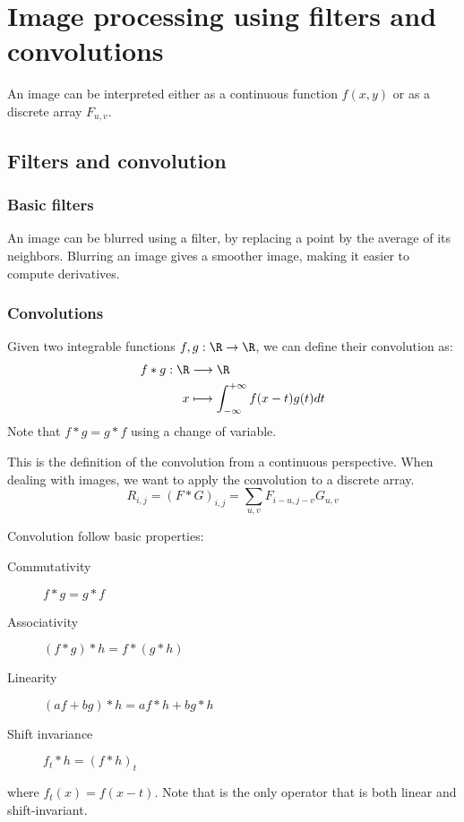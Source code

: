 \section{Image processing using filters and convolutions}
An image can be interpreted either as a continuous function $f(x, y)$ or as a discrete array $F_{u,v}$.

\subsection{Filters and convolution}
\subsubsection{Basic filters}
An image can be blurred using a filter, by replacing a point by the average of its neighbors. Blurring an image gives a smoother image, making it easier to compute derivatives. 

\subsubsection{Convolutions}
Given two integrable functions $f, g:\R\to\R$, we can define their convolution as:
\begin{align*}
    f*g: \R&\longrightarrow \R\\
    x&\longmapsto\int_{-\infty}^{+\infty}f(x-t)g(t)dt
\end{align*}
Note that $f*g=g*f$ using a change of variable.

This is the definition of the convolution from a continuous perspective. When dealing with images, we want to apply the convolution to a discrete array.
\begin{equation*}
    R_{i,j} = (F*G)_{i,j} = \sum_{u,v} F_{i-u, j-v}G_{u,v}
\end{equation*}


Convolution follow basic properties:
\begin{description}
    \item[Commutativity] $f*g=g*f$
    \item[Associativity] $(f*g)*h = f*(g*h)$
    \item[Linearity] $(af+bg)*h = af*h + bg*h$
    \item[Shift invariance] $f_t * h = (f*h)_t$
\end{description}
where $f_t(x) = f(x-t)$.
Note that is the only operator that is both linear and shift-invariant.


